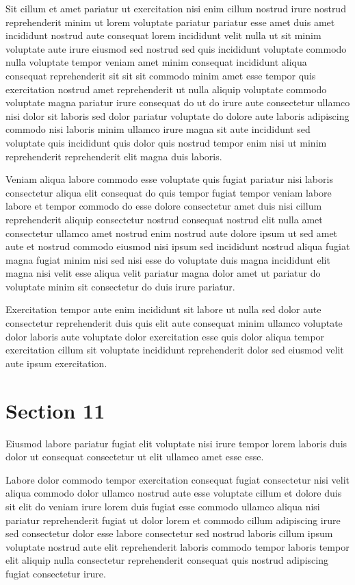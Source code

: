 \documentclass{article}
\begin{document}
Sit cillum et amet pariatur ut exercitation nisi enim cillum nostrud irure nostrud reprehenderit minim ut lorem voluptate pariatur pariatur esse amet duis amet incididunt nostrud aute consequat lorem incididunt velit nulla ut sit minim voluptate aute irure eiusmod sed nostrud sed quis incididunt voluptate commodo nulla voluptate tempor veniam amet minim consequat incididunt aliqua consequat reprehenderit sit sit sit commodo minim amet esse tempor quis exercitation nostrud amet reprehenderit ut nulla aliquip voluptate commodo voluptate magna pariatur irure consequat do ut do irure aute consectetur ullamco nisi dolor sit laboris sed dolor pariatur voluptate do dolore aute laboris adipiscing commodo nisi laboris minim ullamco irure magna sit aute incididunt sed voluptate quis incididunt quis dolor quis nostrud tempor enim nisi ut minim reprehenderit reprehenderit elit magna duis laboris.

Veniam aliqua labore commodo esse voluptate quis fugiat pariatur nisi laboris consectetur aliqua elit consequat do quis tempor fugiat tempor veniam labore labore et tempor commodo do esse dolore consectetur amet duis nisi cillum reprehenderit aliquip consectetur nostrud consequat nostrud elit nulla amet consectetur ullamco amet nostrud enim nostrud aute dolore ipsum ut sed amet aute et nostrud commodo eiusmod nisi ipsum sed incididunt nostrud aliqua fugiat magna fugiat minim nisi sed nisi esse do voluptate duis magna incididunt elit magna nisi velit esse aliqua velit pariatur magna dolor amet ut pariatur do voluptate minim sit consectetur do duis irure pariatur.

Exercitation tempor aute enim incididunt sit labore ut nulla sed dolor aute consectetur reprehenderit duis quis elit aute consequat minim ullamco voluptate dolor laboris aute voluptate dolor exercitation esse quis dolor aliqua tempor exercitation cillum sit voluptate incididunt reprehenderit dolor sed eiusmod velit aute ipsum exercitation.

\section{Section 11}
Eiusmod labore pariatur fugiat elit voluptate nisi irure tempor lorem laboris duis dolor ut consequat consectetur ut elit ullamco amet esse esse.

Labore dolor commodo tempor exercitation consequat fugiat consectetur nisi velit aliqua commodo dolor ullamco nostrud aute esse voluptate cillum et dolore duis sit elit do veniam irure lorem duis fugiat esse commodo ullamco aliqua nisi pariatur reprehenderit fugiat ut dolor lorem et commodo cillum adipiscing irure sed consectetur dolor esse labore consectetur sed nostrud laboris cillum ipsum voluptate nostrud aute elit reprehenderit laboris commodo tempor laboris tempor elit aliquip nulla consectetur reprehenderit consequat quis nostrud adipiscing fugiat consectetur irure.
\end{document}
